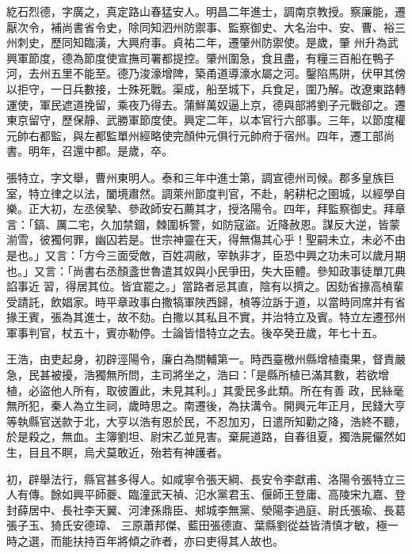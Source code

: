 \begin{pinyinscope}
 紇石烈德，字廣之，真定路山春猛安人。明昌二年進士，調南京教授。察廉能，遷厭次令，補尚書省令史，除同知泗州防禦事、監察御史、大名治中、安、曹、裕三州刺史，歷同知臨潢，大興府事。貞祐二年，遷肇州防禦使。是歲，肇
 州升為武興軍節度，德為節度使宣撫司署都提控。肇州圍急，食且盡，有糧三百船在鴨子河，去州五里不能至。德乃浚濠增陴，築甬道導濠水屬之河。鑿陷馬阱，伏甲其傍以拒守，一日兵數接，士殊死戰。渠成，船至城下，兵食足，圍乃解。改遼東路轉運使，軍民遮道挽留，乘夜乃得去。蒲鮮萬奴逼上京，德與部將劉子元戰卻之。遷東京留守，歷保靜、武勝軍節度使。興定二年，以本官行六部事。三年，以節度權元帥右都監，與左都監單州經略使完顏仲元俱行元帥府于宿州。四年，遷工部尚書。明年，召還中都。是歲，卒。



 張特立，字文舉，曹州東明人。泰和三年中進士第，調宣德州司候。郡多皇族巨室，特立律之以法，闔境肅然。調萊州節度判官，不赴，躬耕杞之圉城，以經學自樂。正大初，左丞侯摯、參政師安石薦其才，授洛陽令。四年，拜監察御史。拜章言：「鎬、厲二宅，久加禁錮，棘圍柝警，如防寇盜。近降赦恩。謀反大逆，皆蒙湔雪，彼獨何罪，幽囚若是。世宗神靈在天，得無傷其心乎！聖嗣未立，未必不由是也。」又言：「方今三面受敵，百姓凋敝，宰執非才，臣恐中興之功未可以歲月期也。」又言：「尚書右丞顏盞世魯遣其奴與小民爭田，失大臣體。參知政事徒單兀典諂事近
 習，得居其位。皆宜罷之。」當路者忌其直，陰有以擠之。因劾省掾高楨輩受請託，飲娼家。時平章政事白撒犒軍陜西歸，楨等泣訴于道，以當時同席并有省掾王賓，張為其進士，故不劾。白撒以其私且不實，并治特立及賓。特立左遷邳州軍事判官，杖五十，賓亦勒停。士論皆惜特立之去。後卒癸丑歲，年七十五。



 王浩，由吏起身，初辟涇陽令，廉白為關輔第一。時西臺檄州縣增植棗果，督責嚴急，民甚被擾，浩獨無所問，主司將坐之，浩曰：「是縣所植已滿其數，若欲增植，必盜他人所有，取彼置此，未見其利。」其愛民多此類。所在有善
 政，民絲毫無所犯，秦人為立生祠，歲時思之。南遷後，為扶溝令。開興元年正月，民錢大亨等執縣官送款于北，大亨以浩有恩於民，不忍加刃，日遣所知勸之降，浩終不聽，於是殺之，無血。主簿劉坦、尉宋乙並見害。棄屍道路，自春徂夏，獨浩屍儼然如生，目且不瞑，烏犬莫敢近，殆若有神護者。



 初，辟舉法行，縣官甚多得人。如咸寧令張天綱、長安令李獻甫、洛陽令張特立三人有傳。餘如興平師夔、臨潼武天禎、氾水黨君玉、偃師王登庸、高陵宋九嘉、登封薛居中、長社李天翼、河津孫鼎臣、郟城李無黨、滎陽李過庭、尉氏張瑜、長葛張子玉、猗氏安德璋、
 三原蕭邦傑、藍田張德直、葉縣劉從益皆清慎才敏，極一時之選，而能扶持百年將傾之祚者，亦曰吏得其人故也。



\end{pinyinscope}